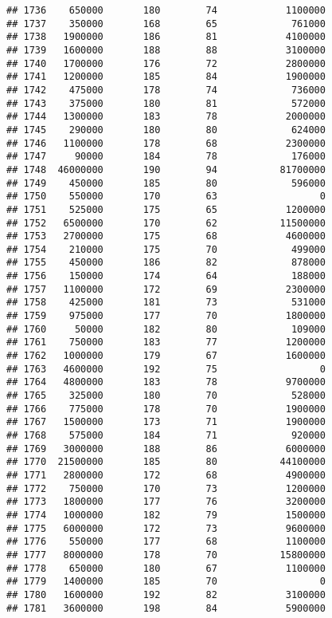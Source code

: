 \documentclass[
]{article}
\begin{document}
\begin{verbatim}
## 1736    650000       180        74            1100000
## 1737    350000       168        65             761000
## 1738   1900000       186        81            4100000
## 1739   1600000       188        88            3100000
## 1740   1700000       176        72            2800000
## 1741   1200000       185        84            1900000
## 1742    475000       178        74             736000
## 1743    375000       180        81             572000
## 1744   1300000       183        78            2000000
## 1745    290000       180        80             624000
## 1746   1100000       178        68            2300000
## 1747     90000       184        78             176000
## 1748  46000000       190        94           81700000
## 1749    450000       185        80             596000
## 1750    550000       170        63                  0
## 1751    525000       175        65            1200000
## 1752   6500000       170        62           11500000
## 1753   2700000       175        68            4600000
## 1754    210000       175        70             499000
## 1755    450000       186        82             878000
## 1756    150000       174        64             188000
## 1757   1100000       172        69            2300000
## 1758    425000       181        73             531000
## 1759    975000       177        70            1800000
## 1760     50000       182        80             109000
## 1761    750000       183        77            1200000
## 1762   1000000       179        67            1600000
## 1763   4600000       192        75                  0
## 1764   4800000       183        78            9700000
## 1765    325000       180        70             528000
## 1766    775000       178        70            1900000
## 1767   1500000       173        71            1900000
## 1768    575000       184        71             920000
## 1769   3000000       188        86            6000000
## 1770  21500000       185        80           44100000
## 1771   2800000       172        68            4900000
## 1772    750000       170        73            1200000
## 1773   1800000       177        76            3200000
## 1774   1000000       182        79            1500000
## 1775   6000000       172        73            9600000
## 1776    550000       177        68            1100000
## 1777   8000000       178        70           15800000
## 1778    650000       180        67            1100000
## 1779   1400000       185        70                  0
## 1780   1600000       192        82            3100000
## 1781   3600000       198        84            5900000

\end{verbatim}
\end{document}
